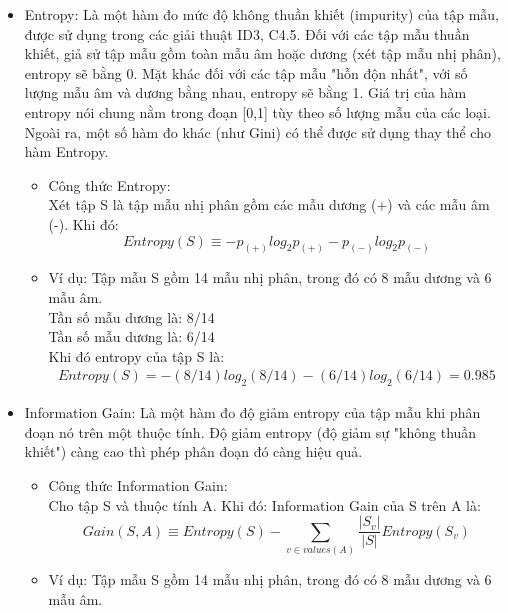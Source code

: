 \documentclass[12pt]{extarticle}
\begin{document}
				\begin{itemize}
					\item{Entropy: Là một hàm đo mức độ không thuần khiết (impurity) của tập mẫu, được sử dụng trong các giải thuật ID3, C4.5. Đối với các tập mẫu thuần khiết, giả sử tập mẫu gồm toàn mẫu âm hoặc dương (xét tập mẫu nhị phân), entropy sẽ bằng 0. Mặt khác đối với các tập mẫu "hỗn độn nhất", với số lượng mẫu âm và dương bằng nhau, entropy sẽ bằng 1. Giá trị của hàm entropy nói chung nằm trong đoạn [0,1] tùy theo số lượng mẫu của các loại. Ngoài ra, một số hàm đo khác (như Gini) có thể được sử dụng thay thể cho hàm Entropy.

					\begin{itemize}
						\item{Công thức Entropy:
						\\Xét tập S là tập mẫu nhị phân gồm các mẫu dương (+) và các mẫu âm (-). Khi đó:
						\begin{equation}					
						Entropy(S) \equiv -p_{(+)}log_{2}p_{(+)} - p_{(-)}log_{2}p_{(-)}
						\end{equation}}						
						\item{Ví dụ: Tập mẫu S gồm 14 mẫu nhị phân, trong đó có 8 mẫu dương và 6 mẫu âm.\\
						Tần số mẫu dương là: 8/14 \\
						Tần số mẫu dương là: 6/14 \\
					 	Khi đó entropy của tập S là:\\	
					 	\begin{align*}						
							Entropy(S) = -(8/14)log_{2}(8/14) - (6/14)log_{2}(6/14) = 0.985
						\end{align*}		
						}
					\end{itemize}}					
					\item{Information Gain: Là một hàm đo độ giảm entropy của tập mẫu khi phân đoạn nó trên một thuộc tính. Độ giảm entropy (độ giảm sự "không thuần khiết") càng cao thì phép phân đoạn đó càng hiệu quả.
					\begin{itemize}
						\item{Công thức Information Gain:
						\\Cho tập S và thuộc tính A. Khi đó: Information Gain của S trên A là:
						\begin{equation}
							\label{eq:gain}
							Gain(S,A) \equiv Entropy(S) - \sum_{v \in values(A)}\frac{|S_v|}{|S|}Entropy(S_v)
						\end{equation}}
						\item{Ví dụ: Tập mẫu S gồm 14 mẫu nhị phân, trong đó có 8 mẫu dương và 6 mẫu âm. 
}
\end{itemize}}
\end{itemize}
\end{document}
